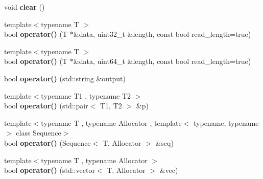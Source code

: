 \begin{DoxyCompactItemize}
\item 
\hypertarget{classstrtk_1_1binary_1_1reader_a85e7d176263e9813dbcff341aaf54e56}{void {\bfseries clear} ()}\label{classstrtk_1_1binary_1_1reader_a85e7d176263e9813dbcff341aaf54e56}

\item 
\hypertarget{classstrtk_1_1binary_1_1reader_aaad03496590bc097b823e519148f1994}{{\footnotesize template$<$typename T $>$ }\\bool {\bfseries operator()} (T $\ast$\&data, uint32\-\_\-t \&length, const bool read\-\_\-length=true)}\label{classstrtk_1_1binary_1_1reader_aaad03496590bc097b823e519148f1994}

\item 
\hypertarget{classstrtk_1_1binary_1_1reader_ab89714a751748c39d132311f53d936c7}{{\footnotesize template$<$typename T $>$ }\\bool {\bfseries operator()} (T $\ast$\&data, uint64\-\_\-t \&length, const bool read\-\_\-length=true)}\label{classstrtk_1_1binary_1_1reader_ab89714a751748c39d132311f53d936c7}

\item 
\hypertarget{classstrtk_1_1binary_1_1reader_a7f1dacb25a8b0ba8bb047f00c5309365}{bool {\bfseries operator()} (std\-::string \&output)}\label{classstrtk_1_1binary_1_1reader_a7f1dacb25a8b0ba8bb047f00c5309365}

\item 
\hypertarget{classstrtk_1_1binary_1_1reader_a435d4cec43c5a9902da0505f6c7243ed}{{\footnotesize template$<$typename T1 , typename T2 $>$ }\\bool {\bfseries operator()} (std\-::pair$<$ T1, T2 $>$ \&p)}\label{classstrtk_1_1binary_1_1reader_a435d4cec43c5a9902da0505f6c7243ed}

\item 
\hypertarget{classstrtk_1_1binary_1_1reader_adc5fb4d93ff892664b5269a42cdd8ea4}{{\footnotesize template$<$typename T , typename Allocator , template$<$ typename, typename $>$ class Sequence$>$ }\\bool {\bfseries operator()} (Sequence$<$ T, Allocator $>$ \&seq)}\label{classstrtk_1_1binary_1_1reader_adc5fb4d93ff892664b5269a42cdd8ea4}

\item 
\hypertarget{classstrtk_1_1binary_1_1reader_ae52a575bf3f36dd642ef682861479370}{{\footnotesize template$<$typename T , typename Allocator $>$ }\\bool {\bfseries operator()} (std\-::vector$<$ T, Allocator $>$ \&vec)}\label{classstrtk_1_1binary_1_1reader_ae52a575bf3f36dd642ef682861479370}


\end{DoxyCompactItemize}
